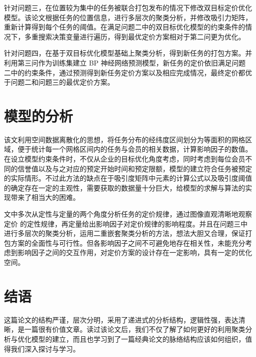 \documentclass{whutmod}
\begin{document}
针对问题三，在位置较为集中的任务被联合打包发布的情况下修改双目标定价优化模型。该论文根据任务的位置信息，进行多层次的聚类分析，并修改吸引力矩阵，重新计算得到每个任务的阈值。在满足问题二中的双目标优化模型的约束条件的情况下，多重搜索决策变量进行遍历，得到最优定价方案相对于第二问更为优化。

针对问题四，在基于双目标优化模型基础上聚类分析，得到新任务的打包方案。并利用第三问作为训练集建立 BP 神经网络预测模型，新任务的定价依旧满足问题二中的约束条件，通过预测得到新任务定价方案以及相应完成情况，最终定价都优于问题二和问题三的最优定价方案。

\section{模型的分析}

该文利用空间数据离散化的思想，将任务分布的经纬度区间划分为等面积的网格区域，便于统计每一个网格区间内的任务与会员的相关数据，计算影响因子的数值。在设立模型约束条件时，不仅从企业的目标优化角度考虑，同时考虑到每位会员不同的信誉值以及与之对应的预定开始时间和预定限额，模型的建立符合任务被预定的实际情形。不过此方法的缺点在于吸引度矩阵中元素的计算公式以及吸引度阈值的确定存在一定的主观性，需要获取的数据量十分巨大，给模型的求解与算法的实现带来了相当大的困难。

文中多次从定性与定量的两个角度分析任务的定价规律，通过图像直观清晰地观察定价 的定性规律，再定量给出影响因子对定价规律的影响程度。并且在问题三中进行多层次的聚类分析，运用二重嵌套聚类分析的方法，想法大胆又合理，保证打包方案的全面性与可行性。但各影响因子之间不可避免地存在相关性，未能充分考虑到影响因子之间的交互作用，对定价方案的设计存在一定影响，具有一定的优化空间。 


\section{结语}
这篇论文的结构严谨，层次分明，采用了递进式的分析结构，逻辑性强，表达清晰，是一篇很有价值文章。读过该论文后，我们不仅了解了如何更好的利用聚类分析与优化模型的建立，而且也学习到了一篇经典论文的脉络结构应该如何组织，值得我们深入探讨与学习。
\end{document}
